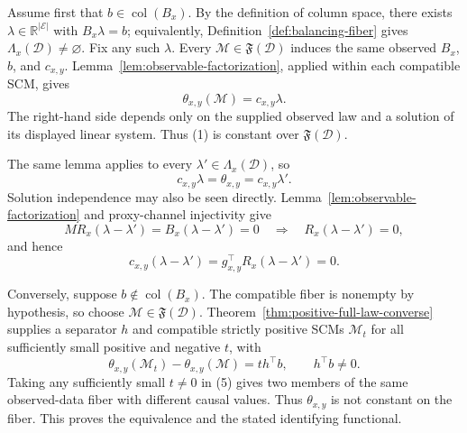 Assume first that \(b\in\operatorname{col}(B_x)\).  By the definition of column space, there exists \(\lambda\in\mathbb R^{\lvert\mathcal E\rvert}\) with \(B_x\lambda=b\); equivalently, Definition~\ref{def:balancing-fiber} gives \(\Lambda_x(\mathcal D)\ne\varnothing\).  Fix any such \(\lambda\).  Every \(\mathcal M\in\mathfrak F(\mathcal D)\) induces the same observed \(B_x\), \(b\), and \(c_{x,y}\).  Lemma~\ref{lem:observable-factorization}, applied within each compatible SCM, gives
\[
\theta_{x,y}(\mathcal M)=c_{x,y}\lambda.
\tag{1}
\]
The right-hand side depends only on the supplied observed law and a solution of its displayed linear system.  Thus (1) is constant over \(\mathfrak F(\mathcal D)\).

The same lemma applies to every \(\lambda'\in\Lambda_x(\mathcal D)\), so
\[
c_{x,y}\lambda=\theta_{x,y}=c_{x,y}\lambda'.
\tag{2}
\]
Solution independence may also be seen directly.  Lemma~\ref{lem:observable-factorization} and proxy-channel injectivity give
\[
MR_x(\lambda-\lambda')=B_x(\lambda-\lambda')=0
\quad\Longrightarrow\quad
R_x(\lambda-\lambda')=0,
\tag{3}
\]
and hence
\[
c_{x,y}(\lambda-\lambda')
=g_{x,y}^{\top}R_x(\lambda-\lambda')=0.
\tag{4}
\]

Conversely, suppose \(b\notin\operatorname{col}(B_x)\).  The compatible fiber is nonempty by hypothesis, so choose \(\mathcal M\in\mathfrak F(\mathcal D)\).  Theorem~\ref{thm:positive-full-law-converse} supplies a separator \(h\) and compatible strictly positive SCMs \(\mathcal M_t\) for all sufficiently small positive and negative \(t\), with
\[
\theta_{x,y}(\mathcal M_t)-\theta_{x,y}(\mathcal M)
=t h^{\top}b,
\qquad h^{\top}b\ne0.
\tag{5}
\]
Taking any sufficiently small \(t\ne0\) in (5) gives two members of the same observed-data fiber with different causal values.  Thus \(\theta_{x,y}\) is not constant on the fiber.  This proves the equivalence and the stated identifying functional.